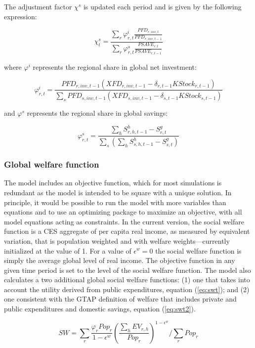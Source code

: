 \documentclass[11pt,letterpaper]{report}
\begin{document}
\noindent The adjustment factor $\chi^s$ is updated each period
and is given by the following expression:

\[
\chi^s_t = \frac
{\sum_r{\varphi^i_{r,t}
\frac{\mathit{PFD}_{r,\mathit{inv},t}}
     {\mathit{PFD}_{r,\mathit{inv},t-1}}}}
{\sum_r{\varphi^s_{r,t}
\frac{\mathit{PSAVE}_{r,t}}
     {\mathit{PSAVE}_{r,t-1}}}}
\]

\noindent where $\varphi^i$ represents the regional share in global net
investment:

\[
\varphi^i_{r,t} = \frac
{\mathit{PFD}_{r,\mathit{inv},t-1}
\left(\mathit{XFD}_{r,\mathit{inv},t-1} - \delta_{r,t-1} \mathit{KStock}_{r,t-1}\right)}
{\sum_s{\mathit{PFD}_{s,\mathit{inv},t-1}
\left(\mathit{XFD}_{s,\mathit{inv},t-1} - \delta_{s,t-1} \mathit{KStock}_{s,t-1}\right)}}
\]

\noindent and $\varphi^s$ represents the regional share in global
savings:

\[
\varphi^s_{r,t} = \frac
{
\sum_h{S^h_{r,h,t-1}} - S^g_{r,t}}
{\sum_s{\left(\sum_h{S^h_{s,h,t-1}} - S^g_{s,t}\right)}}
\]

\subsubsection{Global welfare function}

The model includes an objective function, which for most simulations
is redundant as the model is intended to be square with a unique
solution. In principle, it would be possible to run the model
with more variables than equations and to use an optimizing package
to maximize an objective, with all model equations acting as constraints.
In the current version, the social welfare function is a CES
aggregate of per capita real income, as measured by equivalent variation,
that is population weighted and with welfare weights---currently initialized
at the value of 1. For a value of $\epsilon^w=0$ the social welfare function
is simply the average global level of real income. The objective function
in any given time period is set to the level of the social welfare function.
The model also calculates a two additional global social welfare functions:
(1) one that takes into account the utility derived from public expenditures,
equation (\ref{eq:swt}); and (2) one consistent with the GTAP definition
of welfare that includes private and public expenditures and domestic savings,
equation (\ref{eq:swt2}).

\begin{equation}
\label{eq:sw}
\mathit{SW} = \sum_{r}{ \frac{\varphi_r \mathit{Pop}_r}{1-\epsilon^w}
\left(\frac{\sum_h{\mathit{EV}_{r,h}}} {\mathit{Pop}_r} \right) }^{1-\epsilon^w} \bigg /
\sum_{r}{\mathit{Pop}_r}
\end{equation}
\end{document}
